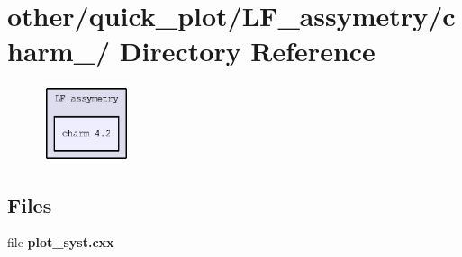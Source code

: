 \section{other/quick\_\-plot/LF\_\-assymetry/charm\_/ Directory Reference}
\label{dir_87206417f1766d7313752ef996dc82d1}


\begin{figure}[H]
\begin{center}
\leavevmode
\includegraphics[width=72pt]{dir_87206417f1766d7313752ef996dc82d1_dep}
\end{center}
\end{figure}
\subsection*{Files}
\begin{CompactItemize}
\item 
file \textbf{plot\_\-syst.cxx}
\end{CompactItemize}
